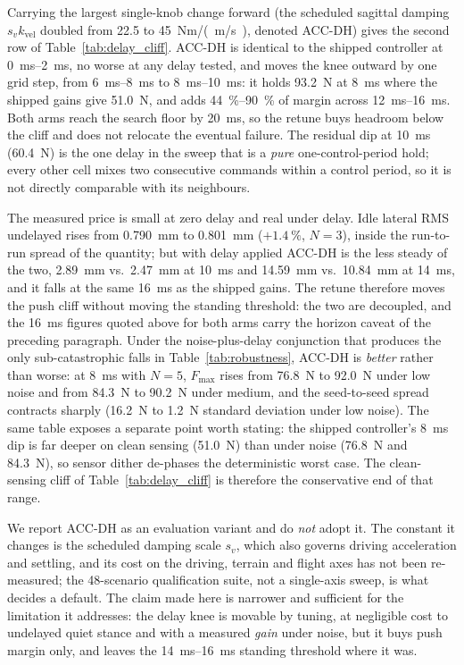 \documentclass[conference]{IEEEtran}
\begin{document}
Carrying the largest single-knob change forward (the scheduled sagittal damping $s_v k_{\text{vel}}$ doubled from \SI{22.5}{} to \SI{45}{Nm/(m/s)}, denoted ACC-DH) gives the second row of Table~\ref{tab:delay_cliff}. ACC-DH is identical to the shipped controller at \SIrange{0}{2}{ms}, no worse at any delay tested, and moves the knee outward by one grid step, from \SIrange{6}{8}{ms} to \SIrange{8}{10}{ms}: it holds \SI{93.2}{N} at \SI{8}{ms} where the shipped gains give \SI{51.0}{N}, and adds \SIrange{44}{90}{\percent} of margin across \SIrange{12}{16}{ms}. Both arms reach the search floor by \SI{20}{ms}, so the retune buys headroom below the cliff and does not relocate the eventual failure. The residual dip at \SI{10}{ms} (\SI{60.4}{N}) is the one delay in the sweep that is a \emph{pure} one-control-period hold; every other cell mixes two consecutive commands within a control period, so it is not directly comparable with its neighbours.

The measured price is small at zero delay and real under delay. Idle lateral RMS undelayed rises from \SI{0.790}{mm} to \SI{0.801}{mm} ($+\SI{1.4}{\percent}$, $N{=}3$), inside the run-to-run spread of the quantity; but with delay applied ACC-DH is the less steady of the two, \SI{2.89}{mm} vs.\ \SI{2.47}{mm} at \SI{10}{ms} and \SI{14.59}{mm} vs.\ \SI{10.84}{mm} at \SI{14}{ms}, and it falls at the same \SI{16}{ms} as the shipped gains. The retune therefore moves the push cliff without moving the standing threshold: the two are decoupled, and the \SI{16}{ms} figures quoted above for both arms carry the horizon caveat of the preceding paragraph. Under the noise-plus-delay conjunction that produces the only sub-catastrophic falls in Table~\ref{tab:robustness}, ACC-DH is \emph{better} rather than worse: at \SI{8}{ms} with $N{=}5$, $F_{\max}$ rises from \SI{76.8}{N} to \SI{92.0}{N} under low noise and from \SI{84.3}{N} to \SI{90.2}{N} under medium, and the seed-to-seed spread contracts sharply (\SI{16.2}{N} to \SI{1.2}{N} standard deviation under low noise). The same table exposes a separate point worth stating: the shipped controller's \SI{8}{ms} dip is far deeper on clean sensing (\SI{51.0}{N}) than under noise (\SI{76.8}{N} and \SI{84.3}{N}), so sensor dither de-phases the deterministic worst case. The clean-sensing cliff of Table~\ref{tab:delay_cliff} is therefore the conservative end of that range.

We report ACC-DH as an evaluation variant and do \emph{not} adopt it. The constant it changes is the scheduled damping scale $s_v$, which also governs driving acceleration and settling, and its cost on the driving, terrain and flight axes has not been re-measured; the \num{48}-scenario qualification suite, not a single-axis sweep, is what decides a default. The claim made here is narrower and sufficient for the limitation it addresses: the delay knee is movable by tuning, at negligible cost to undelayed quiet stance and with a measured \emph{gain} under noise, but it buys push margin only, and leaves the \SIrange{14}{16}{ms} standing threshold where it was.
\end{document}
